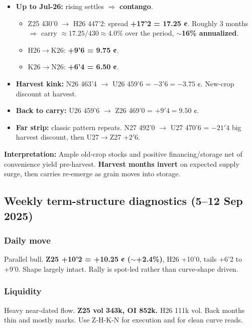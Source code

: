 \documentclass[10pt,a4paper]{article} %
\begin{document}
\begin{itemize}
  \item \textbf{Up to Jul-26:} rising settles $\Rightarrow$ \textbf{contango}.
    \begin{itemize}
      \item Z25 430'0 $\rightarrow$ H26 447'2: spread \textbf{+17'2 = 17.25 ¢}. Roughly 3 months $\Rightarrow$ carry $\approx 17.25/430 \approx 4.0\%$ over the period, \textbf{$\sim$16\% annualized}.
      \item H26$\rightarrow$K26: \textbf{+9'6 = 9.75 ¢}.
      \item K26$\rightarrow$N26: \textbf{+6'4 = 6.50 ¢}.
    \end{itemize}
  \item \textbf{Harvest kink:} N26 463'4 $\rightarrow$ U26 459'6 = $-3'6 = -3.75$ ¢. New-crop discount at harvest.
  \item \textbf{Back to carry:} U26 459'6 $\rightarrow$ Z26 469'0 = $+9'4 = 9.50$ ¢.
  \item \textbf{Far strip:} classic pattern repeats. N27 492'0 $\rightarrow$ U27 470'6 = $-21'4$ big harvest discount, then U27$\rightarrow$Z27 $+2'6$.
\end{itemize}

\textbf{Interpretation:} Ample old-crop stocks and positive financing/storage net of convenience yield pre-harvest. \textbf{Harvest months invert} on expected supply surge, then carries re-emerge as grain moves into storage.


\subsection{Weekly term-structure diagnostics (5–12 Sep 2025)}

\subsubsection*{Daily move}

Parallel bull. \textbf{Z25 +10'2 = +10.25 ¢ ($\sim$+2.4\%)}, H26 +10'0, tails +6'2 to +9'0. Shape largely intact. Rally is spot-led rather than curve-shape driven.

\subsubsection*{Liquidity}

Heavy near-dated flow. \textbf{Z25 vol 343k, OI 852k.} H26 111k vol. Back months thin and mostly marks. Use Z-H-K-N for execution and for clean curve reads.
\end{document}
